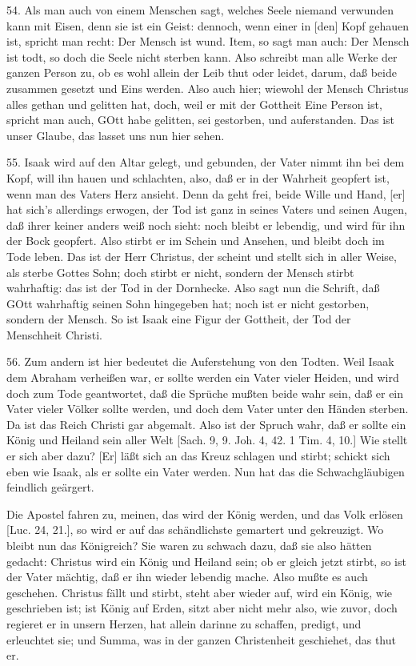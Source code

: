 54. Als man auch von einem Menschen sagt, welches Seele niemand verwunden kann mit Eisen, denn sie ist ein Geist: dennoch, wenn einer in [den] Kopf gehauen ist, spricht man recht: Der Mensch ist wund. Item, so sagt man auch: Der Mensch ist todt, so doch die Seele nicht sterben kann. Also schreibt man alle Werke der ganzen Person zu, ob es wohl allein der Leib thut oder leidet, darum, daß beide zusammen gesetzt und Eins werden. Also auch hier; wiewohl der Mensch Christus alles gethan und gelitten hat, doch, weil er mit der Gottheit Eine Person ist, spricht man auch, GOtt habe gelitten, sei gestorben, und auferstanden. Das ist unser Glaube, das lasset uns nun hier sehen.

55. Isaak wird auf den Altar gelegt, und gebunden, der Vater nimmt ihn bei dem Kopf, will ihn hauen und schlachten, also, daß er in der Wahrheit geopfert ist, wenn man des Vaters Herz ansieht. Denn da geht frei, beide Wille und Hand, [er] hat sich's allerdings erwogen, der Tod ist ganz in seines Vaters und seinen Augen, daß ihrer keiner anders weiß noch sieht: noch bleibt er lebendig, und wird für ihn der Bock geopfert. Also stirbt er im Schein und Ansehen, und bleibt doch im Tode leben. Das ist der Herr Christus, der scheint und stellt sich in aller Weise, als sterbe Gottes Sohn; doch stirbt er nicht, sondern der Mensch stirbt wahrhaftig: das ist der Tod in der Dornhecke. Also sagt nun die Schrift, daß GOtt wahrhaftig seinen Sohn hingegeben hat; noch ist er nicht gestorben, sondern der Mensch. So ist Isaak eine Figur der Gottheit, der Tod der Menschheit Christi.

56. Zum andern ist hier bedeutet die Auferstehung von den Todten. Weil Isaak dem Abraham verheißen war, er sollte werden ein Vater vieler Heiden, und wird doch zum Tode geantwortet, daß die Sprüche mußten beide wahr sein, daß er ein Vater vieler Völker sollte werden, und doch dem Vater unter den Händen sterben. Da ist das Reich Christi gar abgemalt. Also ist der Spruch wahr, daß er sollte ein König und Heiland sein aller Welt [Sach. 9, 9. Joh. 4, 42. 1 Tim. 4, 10.] Wie stellt er sich aber dazu? [Er] läßt sich an das Kreuz schlagen und stirbt; schickt sich eben wie Isaak, als er sollte ein Vater werden. Nun hat das die Schwachgläubigen feindlich geärgert.

Die Apostel fahren zu, meinen, das wird der König werden, und das Volk erlösen [Luc. 24, 21.], so wird er auf das schändlichste gemartert und gekreuzigt. Wo bleibt nun das Königreich? Sie waren zu schwach dazu, daß sie also hätten gedacht: Christus wird ein König und Heiland sein; ob er gleich jetzt stirbt, so ist der Vater mächtig, daß er ihn wieder lebendig mache. Also mußte es auch geschehen. Christus fällt und stirbt, steht aber wieder auf, wird ein König, wie geschrieben ist; ist König auf Erden, sitzt aber nicht mehr also, wie zuvor, doch regieret er in unsern Herzen, hat allein darinne zu schaffen, predigt, und erleuchtet sie; und Summa, was in der ganzen Christenheit geschiehet, das thut er.

